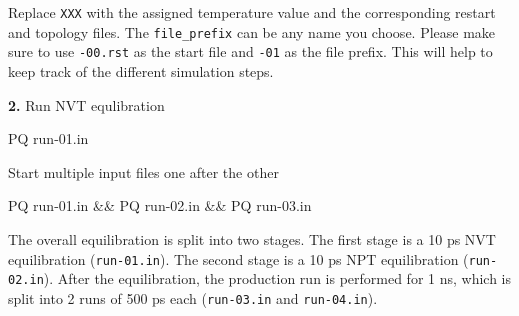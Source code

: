 \documentclass[
  letterpaper,
]{article}
\newenvironment{Shaded}{\begin{snugshade}}{\end{snugshade}}
\newcommand{\ExtensionTok}[1]{\textcolor[rgb]{0.00,0.23,0.31}{#1}}
\newcommand{\KeywordTok}[1]{\textcolor[rgb]{0.00,0.23,0.31}{#1}}
\newcommand{\NormalTok}[1]{\textcolor[rgb]{0.00,0.23,0.31}{#1}}
\begin{document}
\begin{tcolorbox}[enhanced jigsaw, opacitybacktitle=0.6, colback=white, rightrule=.15mm, bottomrule=.15mm, coltitle=black, toprule=.15mm, bottomtitle=1mm, arc=.35mm, colframe=quarto-callout-note-color-frame, opacityback=0, toptitle=1mm, breakable, titlerule=0mm, left=2mm, title=\textcolor{quarto-callout-note-color}{\faInfo}\hspace{0.5em}{Note}, leftrule=.75mm, colbacktitle=quarto-callout-note-color!10!white]

Replace \texttt{XXX} with the assigned temperature value and the
corresponding restart and topology files. The \texttt{file\_prefix} can
be any name you choose. Please make sure to use \texttt{-00.rst} as the
start file and \texttt{-01} as the file prefix. This will help to keep
track of the different simulation steps.

\end{tcolorbox}

\textbf{2.} Run NVT equlibration

\begin{Shaded}
\begin{Highlighting}[]
\ExtensionTok{PQ}\NormalTok{ run{-}01.in}
\end{Highlighting}
\end{Shaded}

Start multiple input files one after the other

\begin{Shaded}
\begin{Highlighting}[]
\ExtensionTok{PQ}\NormalTok{ run{-}01.in }\KeywordTok{\&\&} \ExtensionTok{PQ}\NormalTok{ run{-}02.in }\KeywordTok{\&\&} \ExtensionTok{PQ}\NormalTok{ run{-}03.in}
\end{Highlighting}
\end{Shaded}

\begin{tcolorbox}[enhanced jigsaw, opacitybacktitle=0.6, colback=white, rightrule=.15mm, bottomrule=.15mm, coltitle=black, toprule=.15mm, bottomtitle=1mm, arc=.35mm, colframe=quarto-callout-important-color-frame, opacityback=0, toptitle=1mm, breakable, titlerule=0mm, left=2mm, title=\textcolor{quarto-callout-important-color}{\faExclamation}\hspace{0.5em}{Important}, leftrule=.75mm, colbacktitle=quarto-callout-important-color!10!white]

The overall equilibration is split into two stages. The first stage is a
10 ps NVT equilibration (\texttt{run-01.in}). The second stage is a 10
ps NPT equilibration (\texttt{run-02.in}). After the equilibration, the
production run is performed for 1 ns, which is split into 2 runs of 500
ps each (\texttt{run-03.in} and \texttt{run-04.in}).

\end{tcolorbox}
\end{document}
